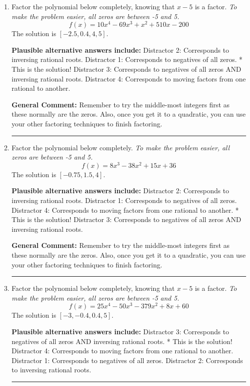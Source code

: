 \documentclass{extbook}[14pt]
\newcommand{\litem}[1]{\item #1

\rule{\textwidth}{0.4pt}}
\begin{document}
\begin{enumerate}\litem{
Factor the polynomial below completely, knowing that $x -5$ is a factor. \textit{To make the problem easier, all zeros are between -5 and 5.}
\[ f(x) = 10x^{4} -69 x^{3} + x^{2} +510 x -200 \]The solution is \( [-2.5, 0.4, 4, 5] \).\begin{enumerate}[label=\Alph*.]
\textbf{Plausible alternative answers include:} Distractor 2: Corresponds to inversing rational roots.
 Distractor 1: Corresponds to negatives of all zeros.
* This is the solution!
 Distractor 3: Corresponds to negatives of all zeros AND inversing rational roots.
 Distractor 4: Corresponds to moving factors from one rational to another.
\end{enumerate}

\textbf{General Comment:} Remember to try the middle-most integers first as these normally are the zeros. Also, once you get it to a quadratic, you can use your other factoring techniques to finish factoring.
}
\litem{
Factor the polynomial below completely. \textit{To make the problem easier, all zeros are between -5 and 5.}
\[ f(x) = 8x^{3} -38 x^{2} +15 x + 36 \]The solution is \( [-0.75, 1.5, 4] \).\begin{enumerate}[label=\Alph*.]
\textbf{Plausible alternative answers include:} Distractor 2: Corresponds to inversing rational roots.
 Distractor 1: Corresponds to negatives of all zeros.
 Distractor 4: Corresponds to moving factors from one rational to another.
* This is the solution!
 Distractor 3: Corresponds to negatives of all zeros AND inversing rational roots.
\end{enumerate}

\textbf{General Comment:} Remember to try the middle-most integers first as these normally are the zeros. Also, once you get it to a quadratic, you can use your other factoring techniques to finish factoring.
}
\litem{
Factor the polynomial below completely, knowing that $x -5$ is a factor. \textit{To make the problem easier, all zeros are between -5 and 5.}
\[ f(x) = 25x^{4} -50 x^{3} -379 x^{2} +8 x + 60 \]The solution is \( [-3, -0.4, 0.4, 5] \).\begin{enumerate}[label=\Alph*.]
\textbf{Plausible alternative answers include:} Distractor 3: Corresponds to negatives of all zeros AND inversing rational roots.
* This is the solution!
 Distractor 4: Corresponds to moving factors from one rational to another.
 Distractor 1: Corresponds to negatives of all zeros.
 Distractor 2: Corresponds to inversing rational roots.
\end{enumerate}

}
\end{enumerate}
\end{document}
